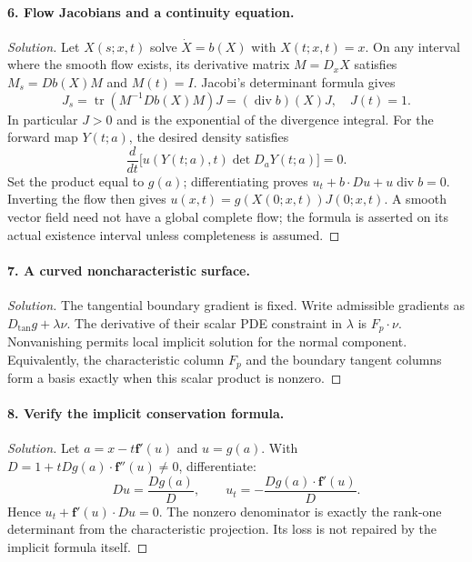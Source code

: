 \Needspace{30mm}
\paragraph{6. Flow Jacobians and a continuity equation.}
\begin{proof}[Solution]
Let $X(s;x,t)$ solve $\dot X=b(X)$ with $X(t;x,t)=x$.
On any interval where the smooth flow exists, its derivative matrix
$M=D_xX$ satisfies $M_s=Db(X)M$ and $M(t)=I$.
Jacobi's determinant formula gives
\[
 J_s=\operatorname{tr}(M^{-1}Db(X)M)J=(\operatorname{div}b)(X)J,
 \quad J(t)=1.
\]
In particular $J>0$ and is the exponential of the divergence integral.
For the forward map $Y(t;a)$, the desired density satisfies
\[
 \frac d{dt}\big[u(Y(t;a),t)\det D_aY(t;a)\big]=0.
\]
Set the product equal to $g(a)$; differentiating proves
$u_t+b\cdot Du+u\operatorname{div}b=0$.
Inverting the flow then gives
$u(x,t)=g(X(0;x,t))J(0;x,t)$.
A smooth vector field need not have a global complete flow; the formula
is asserted on its actual existence interval unless completeness is assumed.
\end{proof}

\Needspace{30mm}
\Needspace{45mm}
\paragraph{7. A curved noncharacteristic surface.}
\begin{proof}[Solution]
The tangential boundary gradient is fixed. Write admissible gradients
as $D_{\tan}g+\lambda\nu$.
The derivative of their scalar PDE constraint in $\lambda$ is
$F_p\cdot\nu$. Nonvanishing permits local implicit solution for the
normal component. Equivalently, the characteristic column $F_p$ and
the boundary tangent columns form a basis exactly when this scalar
product is nonzero.
\end{proof}

\Needspace{30mm}
\paragraph{8. Verify the implicit conservation formula.}
\begin{proof}[Solution]
Let $a=x-t\mathbf f'(u)$ and $u=g(a)$.
With $D=1+tDg(a)\cdot\mathbf f''(u)\ne0$, differentiate:
\[
 Du=\frac{Dg(a)}D,\qquad
 u_t=-\frac{Dg(a)\cdot\mathbf f'(u)}D.
\]
Hence $u_t+\mathbf f'(u)\cdot Du=0$.
The nonzero denominator is exactly the rank-one determinant from the
characteristic projection. Its loss is not repaired by the implicit
formula itself.
\end{proof}

